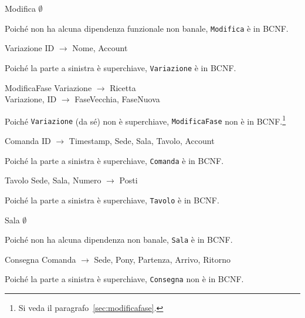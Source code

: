 \begin{samepage}
\begin{funcdep}{Modifica}
    $\emptyset$
\end{funcdep}
Poiché non ha alcuna dipendenza funzionale non banale, {\tt Modifica} è in BCNF.
\end{samepage}

\begin{samepage}
\begin{funcdep}{Variazione}
    ID $\to$ Nome, Account
\end{funcdep}
Poiché la parte a sinistra è superchiave, {\tt Variazione} è in BCNF.
\end{samepage}

\begin{samepage}
\begin{funcdep}{ModificaFase}
    Variazione $\to$ Ricetta\\
    Variazione, ID $\to$ FaseVecchia, FaseNuova
\end{funcdep}
Poiché {\tt Variazione} (da sé) non è superchiave, {\tt ModificaFase} non è in BCNF.\footnote{Si veda il paragrafo~\vref{sec:modificafase}.}
\end{samepage}

\begin{samepage}
\begin{funcdep}{Comanda}
    ID $\to$ Timestamp, Sede, Sala, Tavolo, Account
\end{funcdep}
Poiché la parte a sinistra è superchiave, {\tt Comanda} è in BCNF.
\end{samepage}

\begin{samepage}
\begin{funcdep}{Tavolo}
    Sede, Sala, Numero $\to$ Posti
\end{funcdep}
Poiché la parte a sinistra è superchiave, {\tt Tavolo} è in BCNF.
\end{samepage}

\begin{samepage}
\begin{funcdep}{Sala}
    $\emptyset$
\end{funcdep}
Poiché non ha alcuna dipendenza non banale, {\tt Sala} è in BCNF.
\end{samepage}

\begin{samepage}
\begin{funcdep}{Consegna}
    Comanda $\to$ Sede, Pony, Partenza, Arrivo, Ritorno
\end{funcdep}
Poiché la parte a sinistra è superchiave, {\tt Consegna} non è in BCNF.
\end{samepage}

